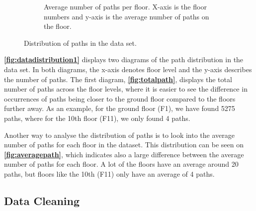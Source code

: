 \begin{figure}[H]
\begin{subfigure}[b]{0.47\textwidth}
         \caption{Average number of paths per floor. X-axis is the floor numbers and y-axis is the average number of paths on the floor.}
         \label{fig:averagepath}
     \end{subfigure}
        \caption{Distribution of paths in the data set.}
        \label{fig:datadistribution1}
\end{figure}

\textbf{\autoref{fig:datadistribution1}} displays two diagrams of the path distribution in the data set. In both diagrams, the x-axis denotes floor level and the y-axis describes the number of paths. The first diagram, \textbf{\autoref{fig:totalpath}}, displays the total number of paths across the floor levels, where it is easier to see the difference in occurrences of paths being closer to the ground floor compared to the floors further away. As an example, for the ground floor (F1), we have found 5275 paths, where for the 10th floor (F11), we only found 4 paths.

Another way to analyse the distribution of paths is to look into the average number of paths for each floor in the dataset. This distribution can be seen on \textbf{\autoref{fig:averagepath}}, which indicates also a large difference between the average number of paths for each floor. A lot of the floors have an average around 20 paths, but floors like the 10th (F11) only have an average of 4 paths. 








\subsection{Data Cleaning}
